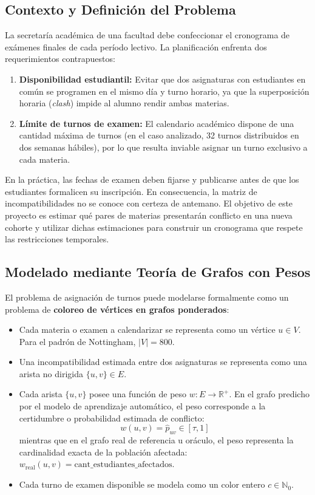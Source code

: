 \documentclass[11pt,a4paper]{article}
\begin{document}
\subsection{Contexto y Definición del Problema}
La secretaría académica de una facultad debe confeccionar el cronograma de exámenes finales de cada período lectivo. La planificación enfrenta dos requerimientos contrapuestos:
\begin{enumerate}[label=\alph*)]
    \item \textbf{Disponibilidad estudiantil:} Evitar que dos asignaturas con estudiantes en común se programen en el mismo día y turno horario, ya que la superposición horaria (\textit{clash}) impide al alumno rendir ambas materias.
    \item \textbf{Límite de turnos de examen:} El calendario académico dispone de una cantidad máxima de turnos (en el caso analizado, 32 turnos distribuidos en dos semanas hábiles), por lo que resulta inviable asignar un turno exclusivo a cada materia.
\end{enumerate}

En la práctica, las fechas de examen deben fijarse y publicarse antes de que los estudiantes formalicen su inscripción. En consecuencia, la matriz de incompatibilidades no se conoce con certeza de antemano. El objetivo de este proyecto es estimar qué pares de materias presentarán conflicto en una nueva cohorte y utilizar dichas estimaciones para construir un cronograma que respete las restricciones temporales.

\subsection{Modelado mediante Teoría de Grafos con Pesos}
El problema de asignación de turnos puede modelarse formalmente como un problema de \textbf{coloreo de vértices en grafos ponderados}:
\begin{itemize}
    \item Cada materia o examen a calendarizar se representa como un vértice $u \in V$. Para el padrón de Nottingham, $|V| = 800$.
    \item Una incompatibilidad estimada entre dos asignaturas se representa como una arista no dirigida $\{u, v\} \in E$.
    \item Cada arista $\{u, v\}$ posee una función de peso $w: E \to \mathbb{R}^+$. En el grafo predicho por el modelo de aprendizaje automático, el peso corresponde a la certidumbre o probabilidad estimada de conflicto:
    \begin{equation}
        w(u, v) = \hat{p}_{uv} \in [\tau, 1]
    \end{equation}
    mientras que en el grafo real de referencia u oráculo, el peso representa la cardinalidad exacta de la población afectada: $w_{\text{real}}(u, v) = \text{cant\_estudiantes\_afectados}$.
    \item Cada turno de examen disponible se modela como un color entero $c \in \mathbb{N}_0$.
\end{itemize}
\end{document}
